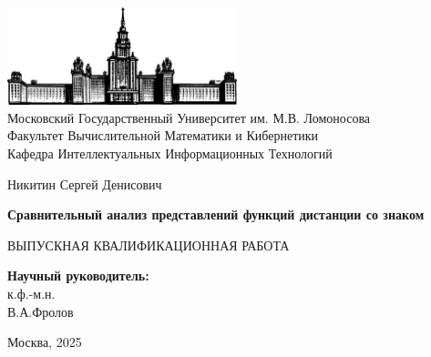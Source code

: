 \documentclass[a4paper,hidelinks,12pt]{article}
\begin{document}
\begin {titlepage}
\thispagestyle{empty}

\begin{center}
	\vspace{-1cm}
	
	
	\includegraphics[width=0.5\textwidth]{gzlogo.png}\\
	Московский Государственный Университет им. М.В. Ломоносова\\
	Факультет Вычислительной Математики и Кибернетики\\
	Кафедра Интеллектуальных Информационных Технологий\\
	
	\vspace{3cm}
	
	{\Large Никитин Сергей Денисович}
	
	\vspace{1cm}
	
	{\LARGE\bfseries Сравнительный анализ представлений функций дистанции со знаком\\}
	
	\vspace{1cm}
	
	{ ВЫПУСКНАЯ КВАЛИФИКАЦИОННАЯ РАБОТА}
\end{center}

\vfill

\begin{flushright}
	\textbf {Научный руководитель:}\\
	к.ф.-м.н.\\
	В.А.Фролов\\
	\vspace{10mm}
\end{flushright}

\vfill

\begin{center}
	Москва, 2025
\end{center}

\end{titlepage}

\setcounter{page}{2}
\onehalfspacing
\end{document}
